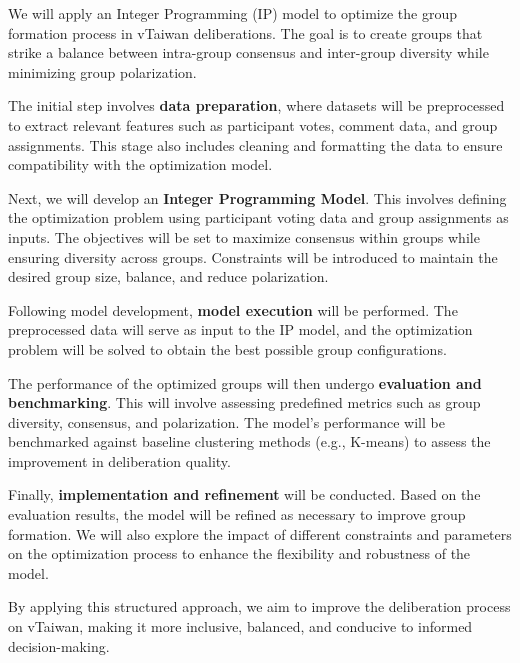 \documentclass[11pt,a4paper]{article}
\begin{document}
We will apply an Integer Programming (IP) model to optimize the group formation process in vTaiwan deliberations. The goal is to create groups that strike a balance between intra-group consensus and inter-group diversity while minimizing group polarization.

The initial step involves \textbf{data preparation}, where datasets will be preprocessed to extract relevant features such as participant votes, comment data, and group assignments. This stage also includes cleaning and formatting the data to ensure compatibility with the optimization model.

Next, we will develop an \textbf{Integer Programming Model}. This involves defining the optimization problem using participant voting data and group assignments as inputs. The objectives will be set to maximize consensus within groups while ensuring diversity across groups. Constraints will be introduced to maintain the desired group size, balance, and reduce polarization.

Following model development, \textbf{model execution} will be performed. The preprocessed data will serve as input to the IP model, and the optimization problem will be solved to obtain the best possible group configurations.

The performance of the optimized groups will then undergo \textbf{evaluation and benchmarking}. This will involve assessing predefined metrics such as group diversity, consensus, and polarization. The model's performance will be benchmarked against baseline clustering methods (e.g., K-means) to assess the improvement in deliberation quality.

Finally, \textbf{implementation and refinement} will be conducted. Based on the evaluation results, the model will be refined as necessary to improve group formation. We will also explore the impact of different constraints and parameters on the optimization process to enhance the flexibility and robustness of the model.

By applying this structured approach, we aim to improve the deliberation process on vTaiwan, making it more inclusive, balanced, and conducive to informed decision-making.



\end{document}
